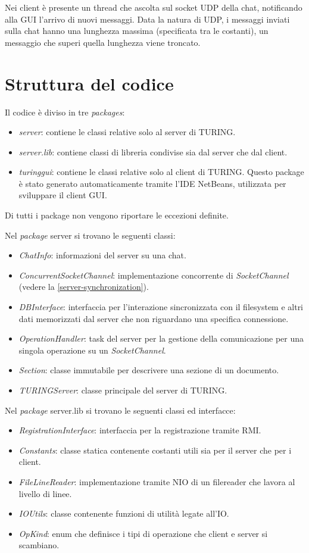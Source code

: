 \documentclass[a4paper]{article}
\theoremstyle{theorem}
\theoremstyle{remark}
\theoremstyle{definition}
\theoremstyle{corollary}
\theoremstyle{lemma}
\begin{document}
Nei client è presente un thread che ascolta sul socket UDP della chat, notificando alla GUI l'arrivo di nuovi messaggi. Data la natura di UDP, i messaggi inviati sulla chat hanno una lunghezza massima (specificata tra le costanti), un messaggio che superi quella lunghezza viene troncato.


\section{Struttura del codice}
Il codice è diviso in tre \textit{packages}:
\begin{itemize}
	\item \textit{server}: contiene le classi relative solo al server di TURING.
	\item \textit{server.lib}: contiene classi di libreria condivise sia dal server che dal client.
	\item \textit{turinggui}: contiene le classi relative solo al client di TURING. Questo package è stato generato automaticamente tramite l'IDE NetBeans, utilizzata per sviluppare il client GUI.
\end{itemize}

Di tutti i package non vengono riportare le eccezioni definite.

Nel \textit{package} server si trovano le seguenti classi:
\begin{itemize}
	\item \textit{ChatInfo}: informazioni del server su una chat.
	\item \textit{ConcurrentSocketChannel}: implementazione concorrente di \textit{SocketChannel} (vedere la \autoref{server-synchronization}).
	\item \textit{DBInterface}: interfaccia per l'interazione sincronizzata con il filesystem e altri dati memorizzati dal server che non riguardano una specifica connessione.
	\item \textit{OperationHandler}: task del server per la gestione della comunicazione per una singola operazione su un \textit{SocketChannel}.
	\item \textit{Section}: classe immutabile per descrivere una sezione di un documento.
	\item \textit{TURINGServer}: classe principale del server di TURING.
\end{itemize}

Nel \textit{package} server.lib si trovano le seguenti classi ed interfacce:
\begin{itemize}
	\item \textit{RegistrationInterface}: interfaccia per la registrazione tramite RMI.
	\item \textit{Constants}: classe statica contenente costanti utili sia per il server che per i client.
	\item \textit{FileLineReader}: implementazione tramite NIO di un filereader che lavora al livello di linee.
	\item \textit{IOUtils}: classe contenente funzioni di utilità legate all'IO.
	\item \textit{OpKind}: enum che definisce i tipi di operazione che client e server si scambiano.
\end{itemize}
\end{document}

